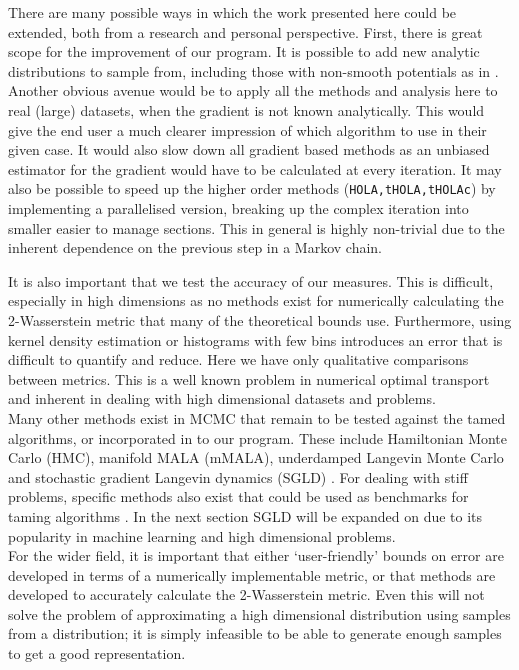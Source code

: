 There are many possible ways in which the work presented here could be extended, both from a research and personal perspective. First, there is great scope for the improvement of our program. It is possible to add new analytic distributions to sample from, including those with non-smooth potentials as in \cite{durmus2018efficient}. Another obvious avenue would be to apply all the methods and analysis here to real (large) datasets, when the gradient is not known analytically. This would give the end user a much clearer impression of which algorithm to use in their given case. It would also slow down all gradient based methods as an unbiased estimator for the gradient would have to be calculated at every iteration. It may also be possible to speed up the higher order methods (\texttt{HOLA,tHOLA,tHOLAc}) by implementing a parallelised version, breaking up the complex iteration into smaller easier to manage sections. This in general is highly non-trivial due to the inherent dependence on the previous step in a Markov chain.

It is also important that we test the accuracy of our measures. This is difficult, especially in high dimensions as no methods exist for numerically calculating the 2-Wasserstein metric that many of the theoretical bounds use. Furthermore, using kernel density estimation or histograms with few bins introduces an error that is difficult to quantify and reduce. Here we have only qualitative comparisons between metrics. This is a well known problem in numerical optimal transport and inherent in dealing with high dimensional datasets and problems.
\\

Many other methods exist in MCMC that remain to be tested against the tamed algorithms, or incorporated in to our program. These include Hamiltonian Monte Carlo (HMC), manifold MALA (mMALA), underdamped Langevin Monte Carlo and stochastic gradient Langevin dynamics (SGLD) \cite{betancourt2017conceptual, Girolami2011,cheng2018,pitfalls}. For dealing with stiff problems, specific methods also exist that could be used as benchmarks for taming algorithms \cite{abdulle2013weak}. In the next section SGLD will be expanded on due to its popularity in machine learning and high dimensional problems. 
\\
For the wider field, it is important that either `user-friendly' bounds on error are developed in terms of a numerically implementable metric, or that methods are developed to accurately calculate the 2-Wasserstein metric. Even this will not solve the problem of approximating a high dimensional distribution using samples from a distribution; it is simply infeasible to be able to generate enough samples to get a good representation. 

